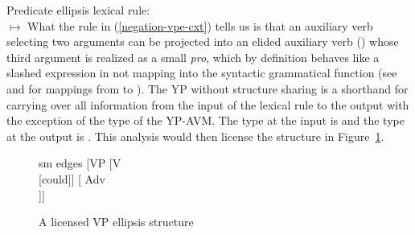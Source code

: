 \documentclass[output=paper,biblatex,babelshorthands,newtxmath,draftmode,colorlinks,citecolor=brown]{langscibook}
\begin{document}
\begin{exe}
\begin{xlist}
\begin{exe}
\begin{xlist}
\ea
\label{negation-vpe-cxt}
Predicate ellipsis lexical rule:\\
  $\mapsto$
\z
%
%
\largerpage
What the rule in (\ref{negation-vpe-cxt}) tells us is that an auxiliary verb selecting two arguments
can be projected into an elided auxiliary verb () whose third
argument is realized as a small \emph{pro}, which by definition
behaves like a slashed expression in not mapping into the syntactic grammatical
 function \comps (see  and  for mappings from
 \argst to \comps). The YP without structure sharing is a shorthand for carrying over all
   information from the input of the lexical rule to the output with the exception of the type of
   the YP-AVM. The type at the input is  and the type at the output is .
This analysis would then license
the structure in Figure~\ref{negation-could-not}.
\begin{figure}
	\begin{forest}
		sm edges
		[VP
			[V\\
					[could]]
			[ Adv\\
					[not]]]
	\end{forest}
\caption{A licensed VP ellipsis structure}\label{negation-could-not}
\end{figure}


\end{xlist}
\end{exe}
\end{xlist}
\end{exe}
\end{document}
